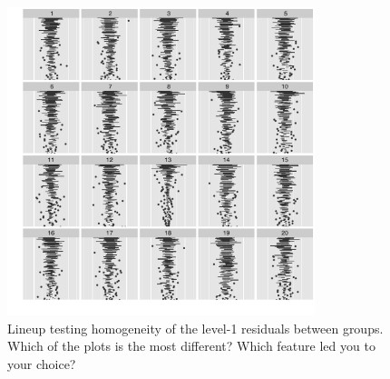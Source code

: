 \documentclass[12pt]{article}
\newcommand{\al}[1]{{\color{ForestGreen} #1}}
\newcommand{\alnote}[1]{\todo[inline,color=green!40]{#1}} %
\newcommand{\hhnote}[1]{\todo[inline,color=orange!40]{#1}}
\begin{document}

%
%
%

\begin{figure}[hbt]
	\centering
	\includegraphics[width=0.8\textwidth]{cyclone-13.pdf}
	\caption{\label{fig:badcyclone} 
	Lineup testing homogeneity of the level-1 residuals between groups. Which of the plots is the most different? Which feature led you to your choice?}
\end{figure}
\end{document}
